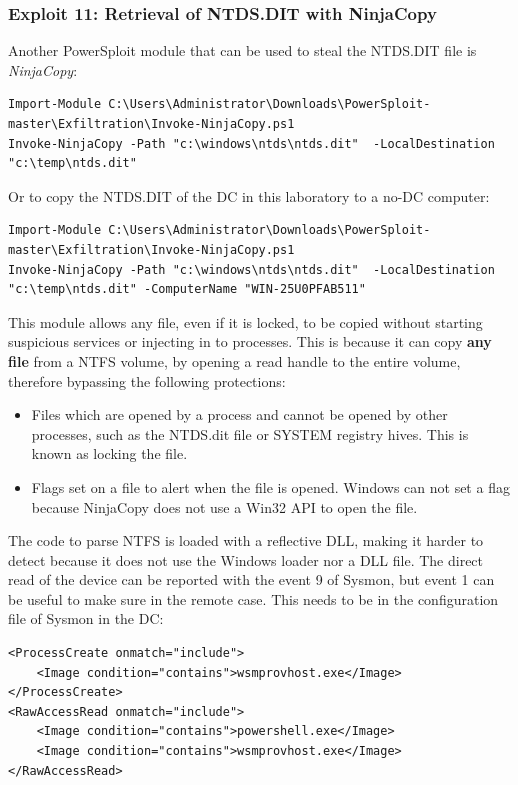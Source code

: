 \subsubsection{Exploit 11: Retrieval of NTDS.DIT with NinjaCopy} \label{invoke-NinjaCopy}
Another PowerSploit module that can be used to steal the NTDS.DIT file is \textit{NinjaCopy}:
\begin{lstlisting}[style=PS]
Import-Module C:\Users\Administrator\Downloads\PowerSploit-master\Exfiltration\Invoke-NinjaCopy.ps1
Invoke-NinjaCopy -Path "c:\windows\ntds\ntds.dit"  -LocalDestination "c:\temp\ntds.dit"
\end{lstlisting}
\linej
Or to copy the NTDS.DIT of the DC in this laboratory to a no-DC computer:
\begin{lstlisting}[style=PS]
Import-Module C:\Users\Administrator\Downloads\PowerSploit-master\Exfiltration\Invoke-NinjaCopy.ps1
Invoke-NinjaCopy -Path "c:\windows\ntds\ntds.dit"  -LocalDestination "c:\temp\ntds.dit" -ComputerName "WIN-25U0PFAB511"
\end{lstlisting}
\linej
This module allows any file, even if it is locked, to be copied without starting suspicious services or injecting in to processes. This is because it can copy \textbf{any file} from a NTFS volume, by opening a read handle to the entire volume, therefore bypassing the following protections\cite{dump_ways}:
\begin{itemize}
	\item Files which are opened by a process and cannot be opened by other processes, such as the NTDS.dit file or SYSTEM registry hives. This is known as locking the file.
	\item Flags set on a file to alert when the file is opened. Windows can not set a flag because NinjaCopy does not use a Win32 API to open the file.
\end{itemize}
\linej
The code to parse NTFS is loaded with a reflective DLL, making it harder to detect because it does not use the Windows loader nor a DLL file.
\linej
The direct read of the device can be reported with the event 9 of Sysmon, but event 1 can be useful to make sure in the remote case. This needs to be in the configuration file of Sysmon in the DC:
\begin{lstlisting}[style=xml]
<ProcessCreate onmatch="include">
	<Image condition="contains">wsmprovhost.exe</Image>
</ProcessCreate>
<RawAccessRead onmatch="include">
	<Image condition="contains">powershell.exe</Image>
	<Image condition="contains">wsmprovhost.exe</Image>
</RawAccessRead>
\end{lstlisting}
